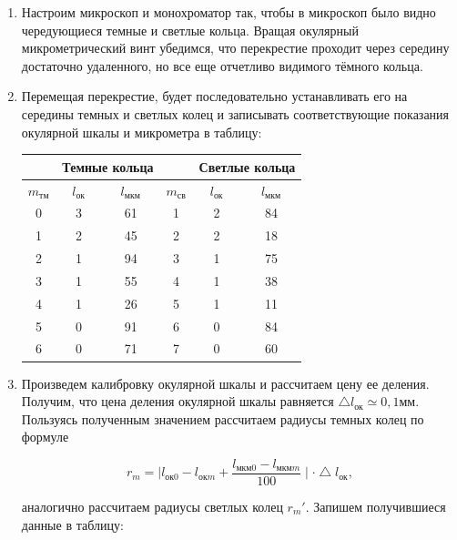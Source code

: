 \documentclass[a4paper, 12pt]{article}%
\begin{document}
\begin{enumerate}

\item Настроим микроскоп и монохроматор так, чтобы в микроскоп было видно чередующиеся темные и светлые кольца. Вращая окулярный микрометрический винт убедимся, что перекрестие проходит через середину достаточно удаленного, но все еще отчетливо видимого тёмного кольца.

\item Перемещая перекрестие, будет последовательно устанавливать его на середины темных и светлых колец и записывать соответствующие показания окулярной шкалы и микрометра в таблицу:

\begin{center}
\begin{tabular}{|c|c|c|c|c|c|}
\hline 
 & \multicolumn{2}{c|}{Темные кольца} & & \multicolumn{2}{c|}{Светлые кольца} \\ 
\hline 
$m_{\text{тм}}$ & $l_{\text{ок}}$ & $l_{\text{мкм}}$ & $m_{\text{св}}$ & $l_{\text{ок}}$ & $l_{\text{мкм}}$ \\ 
\hline 
0 & 3 & 61 & 1 & 2 & 84 \\ 
\hline 
1 & 2 & 45 & 2 & 2 & 18 \\ 
\hline 
2 & 1 & 94 & 3 & 1 & 75 \\ 
\hline 
3 & 1 & 55 & 4 & 1 & 38 \\ 
\hline 
4 & 1 & 26 & 5 & 1 & 11 \\ 
\hline 
5 & 0 & 91 & 6 & 0 & 84 \\ 
\hline 
6 & 0 & 71 & 7 & 0 & 60 \\ 
\hline 
\end{tabular}
\end{center}

\item Произведем калибровку окулярной шкалы и рассчитаем цену ее деления. Получим, что цена деления окулярной шкалы равняется $\bigtriangleup l_{\text{ок}} \simeq 0,1 \textit{мм}$. Пользуясь полученным значением рассчитаем радиусы темных колец по формуле 

\[r_m = \mid l_{\text{ок} 0} - l_{\text{ок} m} + \frac{l_{\text{мкм} 0} - l_{\text{мкм} m}}{100} \mid \cdot \bigtriangleup l_{\text{ок}},\] 

аналогично рассчитаем радиусы светлых колец $r_m'$. Запишем получившиеся данные в таблицу:


\end{enumerate}
\end{document}
